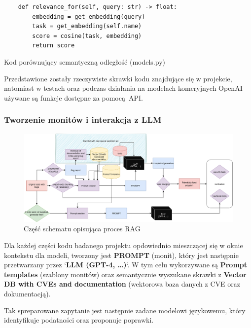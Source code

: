 \begin{listing}
    \begin{verbatim}  
    def relevance_for(self, query: str) -> float:
        embedding = get_embedding(query)
        task = get_embedding(self.name)
        score = cosine(task, embedding)
        return score
    \end{verbatim}
    \caption{Kod porównujący semantyczną odległość (models.py)} 
    \label{listing:vector_relevance}
\end{listing}
    
Przedstawione zostały rzeczywiste skrawki kodu znajdujące się w projekcie, natomiast w testach oraz podczas działania na modelach komeryjnych OpenAI używane są funkcje dostępne za pomocą API.


\subsubsection{Tworzenie monitów i interakcja z LLM}
\begin{figure}[h]
    \centering
    \includegraphics[clip, trim=3cm 10cm 3cm 0cm, width=0.9\linewidth]{img/gptester.drawio.png}
    \caption{Część schematu opisująca proces RAG}
    \label{fig:przyciety_obraz}
\end{figure}
Dla każdej części kodu badanego projektu opdowiednio mieszczącej się w oknie kontekstu dla modeli, tworzony jest \textbf{PROMPT} (monit), który jest następnie przetwarzany przez `\textbf{LLM (GPT-4, \ldots)}`. 
W tym celu wykorzywane są \textbf{Prompt templates} (szablony monitów) oraz semantycznie wyszukane skrawki z \textbf{Vector DB with CVEs and documentation} (wektorowa baza danych z CVE oraz dokumentacją).

Tak spreparowane zapytanie jest następnie zadane modelowi językowemu, który identyfikuje podatności oraz proponuje poprawki.

